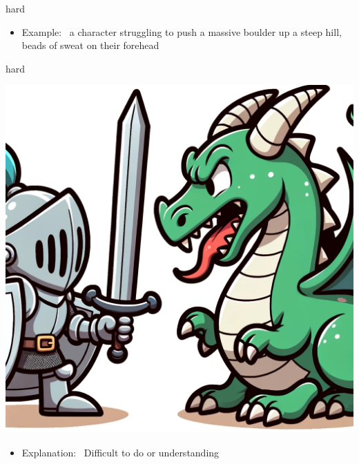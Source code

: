 \documentclass[avery5371, grid,frame]{flashcards}
\begin{document}
\begin{flashcard}{hard}
\begin{center}
\begin{minipage}[c]{.45\textwidth}
\begin{itemize}
            \item Example: \ a character struggling to push a massive boulder up a steep hill, beads of sweat on their forehead
            \end{itemize}
        \end{minipage}
    \end{center}
    \vspace*{\fill}
\end{flashcard}\begin{flashcard}{hard}
    \vspace*{\fill}
    \begin{center}
        \begin{minipage}[c]{.45\textwidth}
            \includegraphics[width=\textwidth]{cards/h/hard/hard - a knight facing a fierce dragon, holding a shield and sword, ready for a challenging battle.png}
        \end{minipage}
        \begin{minipage}[c]{.45\textwidth}
            \begin{itemize}\setlength\itemsep{12pt}
            \item Explanation: \ Difficult to do or understanding


\end{itemize}
\end{minipage}
\end{center}
\end{flashcard}
\end{document}
